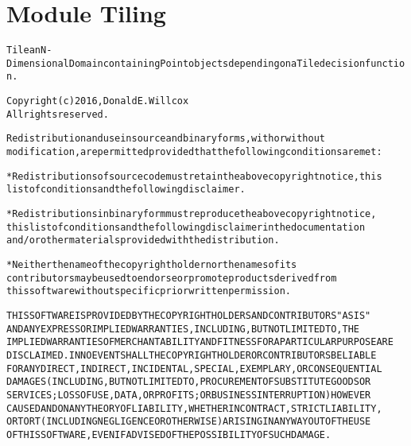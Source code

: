%
%
%


\section{Module Tiling}

    \label{Tiling}
\begin{alltt}

Tile an N-Dimensional Domain containing Point objects depending on a Tile decision function.

Copyright (c) 2016, Donald E. Willcox
All rights reserved.

Redistribution and use in source and binary forms, with or without
modification, are permitted provided that the following conditions are met:

* Redistributions of source code must retain the above copyright notice, this
  list of conditions and the following disclaimer.

* Redistributions in binary form must reproduce the above copyright notice,
  this list of conditions and the following disclaimer in the documentation
  and/or other materials provided with the distribution.

* Neither the name of the copyright holder nor the names of its
  contributors may be used to endorse or promote products derived from
  this software without specific prior written permission.

THIS SOFTWARE IS PROVIDED BY THE COPYRIGHT HOLDERS AND CONTRIBUTORS "AS IS"
AND ANY EXPRESS OR IMPLIED WARRANTIES, INCLUDING, BUT NOT LIMITED TO, THE
IMPLIED WARRANTIES OF MERCHANTABILITY AND FITNESS FOR A PARTICULAR PURPOSE ARE
DISCLAIMED. IN NO EVENT SHALL THE COPYRIGHT HOLDER OR CONTRIBUTORS BE LIABLE
FOR ANY DIRECT, INDIRECT, INCIDENTAL, SPECIAL, EXEMPLARY, OR CONSEQUENTIAL
DAMAGES (INCLUDING, BUT NOT LIMITED TO, PROCUREMENT OF SUBSTITUTE GOODS OR
SERVICES; LOSS OF USE, DATA, OR PROFITS; OR BUSINESS INTERRUPTION) HOWEVER
CAUSED AND ON ANY THEORY OF LIABILITY, WHETHER IN CONTRACT, STRICT LIABILITY,
OR TORT (INCLUDING NEGLIGENCE OR OTHERWISE) ARISING IN ANY WAY OUT OF THE USE
OF THIS SOFTWARE, EVEN IF ADVISED OF THE POSSIBILITY OF SUCH DAMAGE.
\end{alltt}


